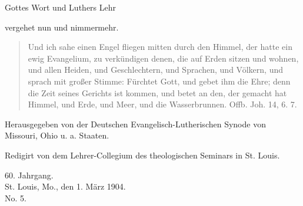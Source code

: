 \begin{titelseite}

Gottes Wort und Luthers Lehr\par
vergehet nun und nimmermehr.

\begin{quote}
Und ich sahe einen Engel fliegen mitten durch den Himmel, der hatte ein ewig Evangelium, zu verkündigen denen, die auf Erden sitzen und wohnen, und allen Heiden, und Geschlechtern, und Sprachen, und Völkern, und sprach mit großer Stimme: Fürchtet Gott, und gebet ihm die Ehre; denn die Zeit seines Gerichts ist kommen, und betet an den, der gemacht hat Himmel, und Erde, und Meer, und die Wasserbrunnen. Offb. Joh. 14, 6. 7.
\end{quote}


Herausgegeben von der Deutschen Evangelisch-Lutherischen Synode von Missouri, Ohio u. a. Staaten.\par
Redigirt von dem Lehrer-Collegium des theologischen Seminars in St. Louis.\par
60. Jahrgang.\\
St. Louis, Mo., den 1. März 1904.\\
No. 5.
\end{titelseite}
